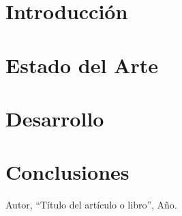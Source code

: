 \documentclass[11pt]{report} %
\begin{document}
\chapter{Introducción} %

\chapter{Estado del Arte} %

\chapter{Desarrollo} %

\chapter{Conclusiones} %

\begin{thebibliography}{9}
     Autor, ``Título del artículo o libro'', Año. %
\end{thebibliography}
\end{document}
